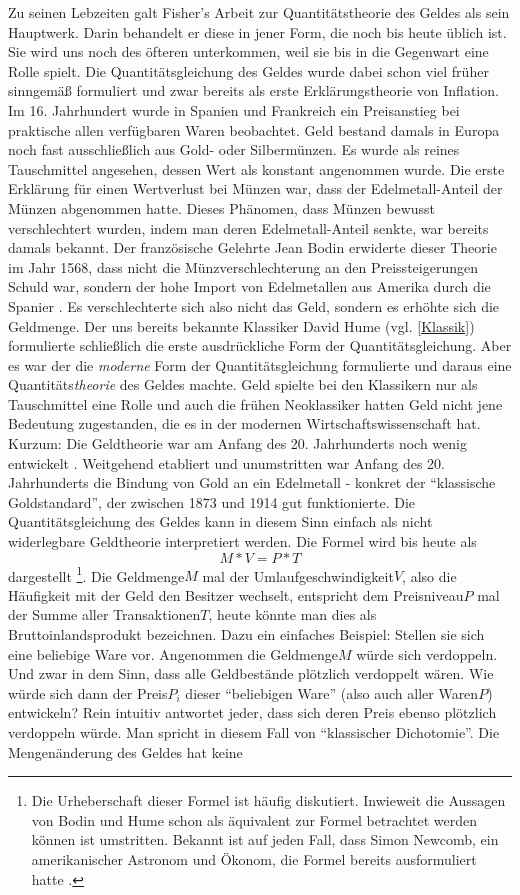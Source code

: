 Zu seinen Lebzeiten galt Fisher's Arbeit zur Quantitätstheorie des Geldes \textcite{Fisher1911} als sein Hauptwerk. Darin behandelt er diese in jener Form, die noch bis heute üblich ist. Sie wird uns noch des öfteren unterkommen, weil sie bis in die Gegenwart eine Rolle spielt. Die Quantitätsgleichung des Geldes wurde dabei schon viel früher sinngemäß formuliert und zwar bereits als erste Erklärungstheorie von Inflation. Im 16. Jahrhundert wurde in Spanien und Frankreich ein Preisanstieg bei praktische allen verfügbaren Waren beobachtet. Geld bestand damals in Europa noch fast ausschließlich aus Gold- oder Silbermünzen. Es wurde als reines Tauschmittel angesehen, dessen Wert als konstant angenommen wurde. Die erste Erklärung für einen Wertverlust bei Münzen war, dass der Edelmetall-Anteil der Münzen abgenommen hatte. Dieses Phänomen, dass Münzen bewusst verschlechtert wurden, indem man deren Edelmetall-Anteil senkte, war bereits damals bekannt. Der französische Gelehrte Jean Bodin erwiderte dieser Theorie im Jahr 1568, dass nicht die Münzverschlechterung an den Preissteigerungen Schuld war, sondern der hohe Import von Edelmetallen aus Amerika durch die Spanier \parencite{OBrien2000}. Es verschlechterte sich also nicht das Geld, sondern es erhöhte sich die Geldmenge. Der uns bereits bekannte Klassiker David Hume (vgl. \ref{Klassik}) formulierte schließlich die erste ausdrückliche Form der Quantitätsgleichung. Aber es war \textcite{Fisher1911} der die \textit{moderne} Form der Quantitätsgleichung formulierte und daraus eine Quantitäts\textit{theorie} des Geldes machte. Geld spielte bei den Klassikern nur als Tauschmittel eine Rolle und auch die frühen Neoklassiker hatten Geld nicht jene Bedeutung zugestanden, die es in der modernen Wirtschaftswissenschaft hat. Kurzum: Die Geldtheorie war am Anfang des 20. Jahrhunderts noch wenig entwickelt \parencite[S. 32]{ Tobin2005}. Weitgehend etabliert und unumstritten war Anfang des 20. Jahrhunderts die Bindung von Gold an ein Edelmetall - konkret der "`klassische Goldstandard"', der zwischen 1873 und 1914 gut funktionierte. Die Quantitätsgleichung des Geldes kann in diesem Sinn einfach als nicht widerlegbare Geldtheorie interpretiert werden. Die Formel wird bis heute als $$M*V = P*T$$ dargestellt \footnote{Die Urheberschaft dieser Formel ist häufig diskutiert. Inwieweit die Aussagen von Bodin und Hume schon als äquivalent zur Formel betrachtet werden können ist umstritten. Bekannt ist auf jeden Fall, dass Simon Newcomb, ein amerikanischer Astronom und Ökonom, die Formel bereits ausformuliert hatte \parencite[S. 33]{Tobin2005}.}. Die Geldmenge$M$ mal der Umlaufgeschwindigkeit$V$, also die Häufigkeit mit der Geld den Besitzer wechselt, entspricht dem Preisniveau$P$ mal der Summe aller Transaktionen$T$, heute könnte man dies als Bruttoinlandsprodukt bezeichnen. Dazu ein einfaches Beispiel: Stellen sie sich eine beliebige Ware vor. Angenommen die Geldmenge$M$ würde sich verdoppeln. Und zwar in dem Sinn, dass alle Geldbestände plötzlich verdoppelt wären. Wie würde sich dann der Preis$P_i$ dieser "`beliebigen Ware"' (also auch aller Waren$P$) entwickeln? Rein intuitiv antwortet jeder, dass sich deren Preis ebenso plötzlich verdoppeln würde. Man spricht in diesem Fall von "`klassischer Dichotomie"'. Die Mengenänderung des Geldes hat keine 